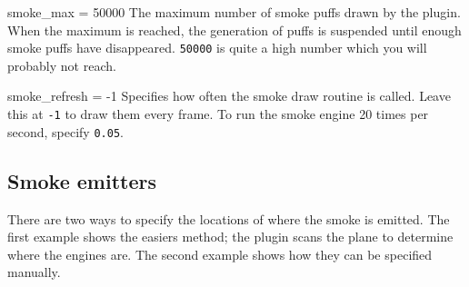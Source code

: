 \documentclass[a4paper,12pt]{article}
\newenvironment{vlist}[1]{%
\begin{list}{}{%
    \settowidth{\labelwidth}{\tt #1 }     %
    \setlength{\leftmargin}{\labelwidth}  %
    \addtolength{\leftmargin}{\labelsep}  %
    \setlength{\parsep}{0.5ex plus 0.2ex minus 0.2ex}
    \setlength{\itemsep}{0.3ex}
    \renewcommand{\makelabel}[1]{\color{headings}\tt ##1 \color{text1}\hfill}}}%
{\end{list}}
\begin{document}
\begin{vlist}{}

\item[smoke\_max = 50000] The maximum number of smoke puffs drawn by
  the plugin. When the maximum is reached, the generation of puffs is
  suspended until enough smoke puffs have disappeared. \texttt{50000}
  is quite a high number which you will probably not reach.

\item[smoke\_refresh = -1] Specifies how often the smoke draw routine is called.
  Leave this at \texttt{-1} to draw them every frame. To run the smoke
  engine 20 times per second, specify \texttt{0.05}.

\end{vlist}{}

\vspace{0.2cm}
\subsection*{\large{\textbf{Smoke emitters}}}
\vspace{0.2cm}

There are two ways to specify the locations of where the smoke is
emitted. The first example shows the easiers method; the plugin scans
the plane to determine where the engines are. The second example shows
how they can be specified manually.
\end{document}
